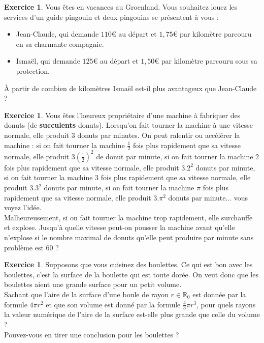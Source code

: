 \documentclass[a4paper,13pt]{scrreprt}
\theoremstyle{plain}
\theoremstyle{definition}
\newtheorem{exo}[subsection]{Exercice}
\newcommand{\rr}{\mathbb{R}}
\begin{document}
\begin{exo} \label{exoei5a}
	Vous êtes en vacances au Groenland. Vous souhaitez louez les services d'un guide pingouin et deux pingouins se présentent à vous : \\
	\begin{itemize}
		\item Jean-Claude, qui demande $110${\euro} au départ et $1,75${\euro} par kilomètre parcouru en sa charmante compagnie.
		\item Ismaël, qui demande $125${\euro} au départ et $1,50${\euro} par kilomètre parcouru sous sa protection.
	\end{itemize}
	À partir de combien de kilomètres Ismaël est-il plus avantageux que Jean-Claude ?
\end{exo}

\begin{exo} \label{exoei5b}
	Vous êtes l'heureux propriétaire d'une machine à fabriquer des donuts (de \textbf{succulents} donuts). Lorsqu'on fait tourner la machine à une vitesse normale, elle produit $3$ donuts par minutes. On peut ralentir ou accélérer la machine : si on fait tourner la machine $\frac{1}{2}$ fois plus rapidement que sa vitesse normale, elle produit $3\left(\frac{1}{2}\right)^2$ de donut par minute, si on fait tourner la machine $2$ fois plus rapidement que sa vitesse normale, elle produit $3.2^2$ donuts par minute, si on fait tourner la machine $3$ fois plus rapidement que sa vitesse normale, elle produit $3.3^2$ donuts par minute, si on fait tourner la machine $\pi$ fois plus rapidement que sa vitesse normale, elle produit $3.{\pi}^2$ donuts par minute... vous voyez l'idée. \\
	Malheureusement, si on fait tourner la machine trop rapidement, elle surchauffe et explose. Jusqu'à quelle vitesse peut-on pousser la machine avant qu'elle n'explose si le nombre maximal de donuts qu'elle peut produire par minute sans problème est $60$ ?
\end{exo}

\begin{exo} \label{exoei5c}
	Supposons que vous cuisinez des boulettes. Ce qui est bon avec les boulettes, c'est la surface de la boulette qui est toute dorée. On veut donc que les boulettes aient une grande surface pour un petit volume. \\
	Sachant que l'aire de la surface d'une boule de rayon $r \in {\rr}_{0}$ est donnée par la formule $4\pi r^2$ et que son volume est donné par la formule $\frac{4}{3} \pi r^3$, pour quels rayons la valeur numérique de l'aire de la surface est-elle plus grande que celle du volume ? \\
	Pouvez-vous en tirer une conclusion pour les boulettes ?
\end{exo}
\end{document}

